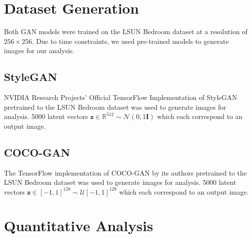 \documentclass[10pt]{article}
\begin{document}
\begin{multicols*}{2}
        \section{Dataset Generation}
        \label{sec:dataset}
        Both GAN models were trained on the LSUN Bedroom dataset\cite{lsunBedroom} at a resolution of $256 \times 256$.
        Due to time constraints, we used pre-trained models to generate images for our analysis.

        \label{sec:datasetGeneration}
        \subsection{StyleGAN}
        \label{subsec:styleganGeneration}
        NVIDIA Research Projects' Official TensorFlow Implementation of StyleGAN pretrained to the LSUN Bedroom dataset\cite{styleGANCode} was used to generate images for analysis.
        5000 latent vectors $\mathbf{z} \in \mathbb{R}^{512} \sim \mathcal{N}(0, 1\mathbf{I})$ which each correspond to an output image.

        \subsection{COCO-GAN}
        \label{subsec:cocoganGeneration}
        The TensorFlow implementation of COCO-GAN by its authors pretrained to the LSUN Bedroom dataset\cite{cocogan} was used to generate images for analysis.
        5000 latent vectors $\mathbf{z} \in [-1, 1]^{128} \sim \mathcal{U}[-1, 1]^{128}$ which each correspond to an output image. 

        \section{Quantitative Analysis}
        \label{sec:quantitative}

\end{multicols*}
\end{document}
